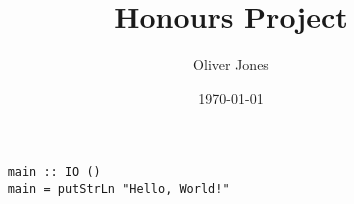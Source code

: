 \documentclass[12pt, a4paper, titlepage]{article}
\title{Honours Project}
\author{Oliver Jones}
\date{\today}
\begin{document}
\maketitle



\tableofcontents

\begin{verbatim}
    main :: IO ()
    main = putStrLn "Hello, World!"
\end{verbatim}



\printbibliography
\end{document}
